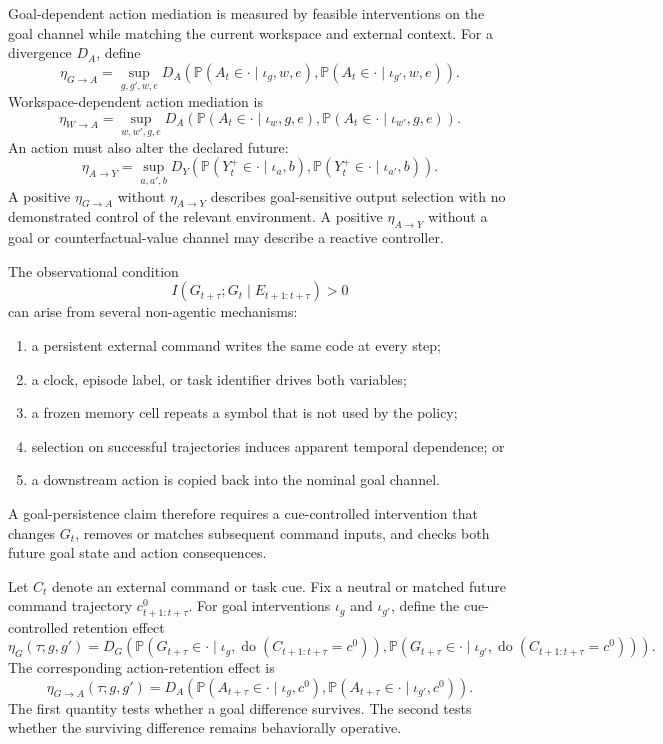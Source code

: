 Goal-dependent action mediation is measured by feasible interventions on the
goal channel while matching the current workspace and external context. For
a divergence \(D_A\), define
\[
\eta_{G\to A}
=
\sup_{g,g',w,e}
D_A
\left(
\mathbb P(A_t\in\cdot\mid\iota_g,w,e),
\mathbb P(A_t\in\cdot\mid\iota_{g'},w,e)
\right).
\]
Workspace-dependent action mediation is
\[
\eta_{W\to A}
=
\sup_{w,w',g,e}
D_A
\left(
\mathbb P(A_t\in\cdot\mid\iota_w,g,e),
\mathbb P(A_t\in\cdot\mid\iota_{w'},g,e)
\right).
\]
An action must also alter the declared future:
\[
\eta_{A\to Y}
=
\sup_{a,a',b}
D_Y
\left(
\mathbb P(Y_t^+\in\cdot\mid\iota_a,b),
\mathbb P(Y_t^+\in\cdot\mid\iota_{a'},b)
\right).
\]
A positive \(\eta_{G\to A}\) without \(\eta_{A\to Y}\) describes goal-sensitive
output selection with no demonstrated control of the relevant environment. A
positive \(\eta_{A\to Y}\) without a goal or counterfactual-value channel may
describe a reactive controller.


The observational condition
\[
I(G_{t+\tau};G_t\mid E_{t+1:t+\tau})>0
\]
can arise from several non-agentic mechanisms:
\begin{enumerate}
\item a persistent external command writes the same code at every step;
\item a clock, episode label, or task identifier drives both variables;
\item a frozen memory cell repeats a symbol that is not used by the policy;
\item selection on successful trajectories induces apparent temporal
 dependence; or
\item a downstream action is copied back into the nominal goal channel.
\end{enumerate}
A goal-persistence claim therefore requires a cue-controlled intervention that
changes \(G_t\), removes or matches subsequent command inputs, and checks both
future goal state and action consequences.


Let \(C_t\) denote an external command or task cue. Fix a neutral or matched
future command trajectory \(c_{t+1:t+\tau}^{0}\). For goal interventions
\(\iota_g\) and \(\iota_{g'}\), define the cue-controlled retention effect
\[
\eta_G(\tau;g,g')
=
D_G
\left(
\mathbb P
\left(
G_{t+\tau}\in\cdot
\mid
\iota_g,
\operatorname{do}(C_{t+1:t+\tau}=c^0)
\right),
\mathbb P
\left(
G_{t+\tau}\in\cdot
\mid
\iota_{g'},
\operatorname{do}(C_{t+1:t+\tau}=c^0)
\right)
\right).
\]
The corresponding action-retention effect is
\[
\eta_{G\to A}(\tau;g,g')
=
D_A
\left(
\mathbb P(A_{t+\tau}\in\cdot\mid\iota_g,c^0),
\mathbb P(A_{t+\tau}\in\cdot\mid\iota_{g'},c^0)
\right).
\]
The first quantity tests whether a goal difference survives. The second tests
whether the surviving difference remains behaviorally operative.

